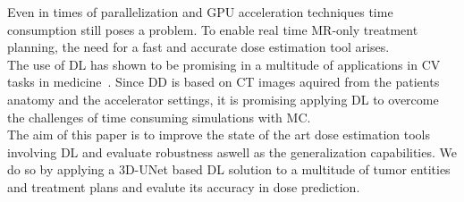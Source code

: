 Even in times of parallelization and GPU acceleration techniques time consumption still poses a problem.
To enable real time MR-only treatment planning, the need for a fast and accurate dose estimation tool arises.\\
The use of \ac{DL} has shown to be promising in a multitude of applications in \ac{CV} tasks in medicine~\cite{esteva_dermatologist-level_2017,cheng_computer-aided_2016,cicero_training_2017,iizuka_deep_2020,poplin_prediction_2018}.
Since \acs{DD} is based on CT images aquired from the patients anatomy and the accelerator settings, it is promising applying \acs{DL} to overcome the challenges of time consuming simulations with \acs{MC}.\\
The aim of this paper is to improve the state of the art dose estimation tools involving \acs{DL} and evaluate robustness aswell as the generalization capabilities.
We do so by applying a 3D-UNet based \acs{DL} solution to a multitude of tumor entities and treatment plans and evalute its accuracy in dose prediction.